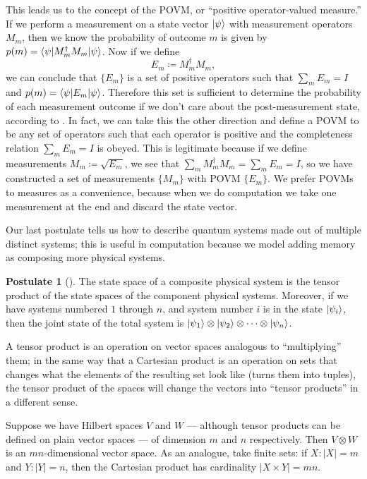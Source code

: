 \documentclass[12pt,twoside]{reedthesis}
\theoremstyle{plain}   %
\theoremstyle{definition}
\newtheorem{post}{Postulate}[section]
\theoremstyle{remark}
\numberwithin{equation}{section}
\begin{document}
  This leads us to the concept of the POVM, or ``positive operator-valued measure.''
  If we perform a measurement on a state vector $\ket{\psi}$ with measurement operators $M_m$, then we know the probability of outcome $m$ is given by $p(m) = \braket{\psi | M_m^\dag M_m | \psi}$.
  Now if we define
  \[ E_m \coloneq M_m^\dag M_m,\]
  we can conclude that $\{E_m\}$ is a set of positive operators such that $\sum_m E_m = I$ and $p(m) = \braket{\psi | E_m | \psi}$.
  Therefore this set is sufficient to determine the probability of each measurement outcome if we don't care about the post-measurement state, according to \cite[2.2.6]{nielsen2010}.
  In fact, we can take this the other direction and define a POVM to be any set of operators such that each operator is positive and the
  completeness relation $\sum_m E_m = I$ is obeyed.
  This is legitimate because if we define measurements $M_m \coloneq \sqrt{E_m}$, we see that $\sum_m M_m^\dag M_m = \sum_m E_m = I$,
  so we have constructed a set of measurements $\{M_m\}$ with POVM $\{E_m\}$.
  We prefer POVMs to measures as a convenience, because when we do computation we take one measurement at the end and discard the state vector. \par
  Our last postulate tells us how to describe quantum systems made out of multiple distinct systems; this is useful in computation because we model adding memory as
  composing more physical systems.
  \begin{post}[{\cite[2.2.8]{nielsen2010}}] 
    The state space of a composite physical system is the tensor product of the state spaces of the component physical systems. Moreover,
    if we have systems numbered $1$ through $n$, and system number $i$ is in the state $\ket{\psi_i }$, then the joint state of the total system is $\ket{\psi_1} \otimes \ket{\psi_2} \otimes \cdots \otimes \ket{\psi_n}$.
  \end{post}
  A tensor product is an operation on vector spaces analogous to ``multiplying'' them;
  in the same way that a Cartesian product is an operation on sets that changes what the elements of the resulting set look like (turns them into tuples),
  the tensor product of the spaces will change the vectors into ``tensor products'' in a different sense.
  \par
  Suppose we have Hilbert spaces $V$ and $W$ --- although tensor products can be defined on plain vector spaces --- of dimension $m$ and $n$ respectively.
  Then $V \otimes W$ is an $mn$-dimensional vector space.
  As an analogue, take finite sets: if $X: |X| = m$ and $Y: |Y| = n$, then the Cartesian product has cardinality $|X \times Y| = mn$.
\end{document}
